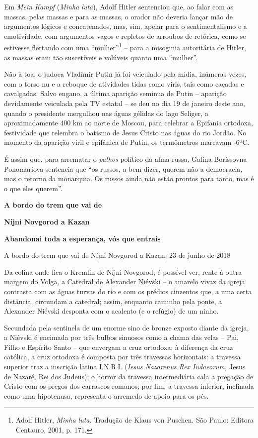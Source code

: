 Em \emph{Mein Kampf} (\emph{Minha luta}), Adolf Hitler sentenciou que,
ao falar com as massas, pelas massas e para as massas, o orador não
deveria lançar mão de argumentos lógicos e concatenados, mas, sim,
apelar para o sentimentalismo e a emotividade, com argumentos vagos e
repletos de arroubos de retórica, como se estivesse flertando com uma
``mulher''\footnote{Adolf Hitler, \emph{Minha luta.} Tradução de Klaus
  von Puschen. São Paulo: Editora Centauro, 2001, p. 171.} -- para a
misoginia autoritária de Hitler, as massas eram tão suscetíveis e
volúveis quanto uma ``mulher''.

Não à toa, o judoca Vladímir Putin já foi veiculado pela mídia, inúmeras
vezes, com o torso nu e a reboque de atividades tidas como viris, tais
como caçadas e cavalgadas. Salvo engano, a última aparição seminua de
Putin -- aparição devidamente veiculada pela TV estatal -- se deu no dia
19 de janeiro deste ano, quando o presidente mergulhou nas águas gélidas
do lago Seliger, a aproximadamente 400 km ao norte de Moscou, para
celebrar a Epifania ortodoxa, festividade que relembra o batismo de
Jesus Cristo nas águas do rio Jordão. No momento da aparição viril e
epifânica de Putin, os termômetros marcavam -6ºC.

É assim que, para arrematar o \emph{pathos} político da alma russa,
Galina Boríssovna Ponomariova sentencia que ``os russos, a bem dizer,
querem não a democracia, mas o retorno da monarquia. Os russos ainda não
estão prontos para tanto, mas é o que eles querem''.

\textbf{A bordo do trem que vai de }

\textbf{Níjni Novgorod a Kazan}

\textbf{Abandonai toda a esperança, vós que entrais}

A bordo do trem que vai de Níjni Novgorod a Kazan, 23 de junho de 2018

Da colina onde fica o Kremlin de Níjni Novgorod, é possível ver, rente à
outra margem do Volga, a Catedral de Alexander Niévski -- o amarelo
vivaz da igreja contrasta com as águas turvas do rio e com os prédios
cinzentos que, a uma certa distância, circundam a catedral; assim,
enquanto caminho pela ponte, a Alexander Niévski desponta com o acalento
(e o refúgio) de um ninho.

Secundada pela sentinela de um enorme sino de bronze exposto diante da
igreja, a Niévski é encimada por três bulbos sinuosos como a chama das
velas -- Pai, Filho e Espírito Santo -- que envergam a cruz ortodoxa; à
diferença da cruz católica, a cruz ortodoxa é composta por três
travessas horizontais: a travessa superior traz a inscrição latina
I.N.R.I. (\emph{Iesus Nazarenus Rex Iudaeorum,} Jesus de Nazaré, Rei dos
Judeus); o horror da travessa intermediária cala a pregação de Cristo
com os pregos dos carrascos romanos; por fim, a travessa inferior,
inclinada como uma hipotenusa, representa o arremedo de apoio para os
pés.

